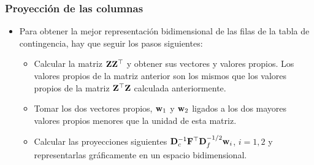 \begin{frame}
\frametitle{Proyección de las columnas}
\begin{itemize}
\item<2->{Para obtener la mejor representación bidimensional de las filas de la tabla de contingencia, hay que seguir los pasos siguientes:
\begin{itemize}
\item<4->{Calcular la matriz $\mathbf{Z}\mathbf{Z}^\top$ y obtener sus vectores y valores propios. Los valores propios de la matriz anterior son los mismos que los valores propios de la matriz $\mathbf{Z}^\top\mathbf{Z}$ calculada anteriormente.}
\item<5->{Tomar los dos vectores propios, $\mathbf{w}_1$ y $\mathbf{w}_2$ ligados a los dos mayores valores propios menores que la unidad de esta matriz.}
\item<6->{Calcular las proyecciones siguientes $\mathbf{D}_c^{-1}\mathbf{F}^\top\mathbf{D}_f^{-1/2}\mathbf{w}_i$, $i=1,2$ y representarlas gráficamente en un espacio bidimensional.}
\end{itemize}}
\end{itemize}
\end{frame}

